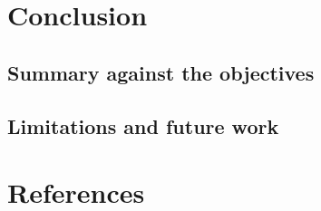 




\newpage
\section{Conclusion}


\subsection{Summary against the objectives}




\subsection{Limitations and future work}










\newpage
\section{References}










